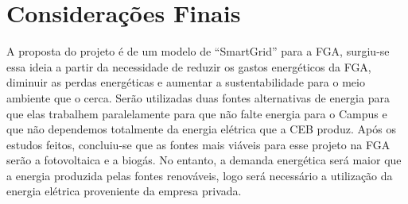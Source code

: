 \chapter[Considerações Finais]{Considerações Finais}

A proposta do projeto é de um modelo de “SmartGrid” para a FGA, surgiu-se essa ideia a partir da necessidade de reduzir os gastos energéticos da FGA, diminuir as perdas energéticas e aumentar a sustentabilidade para o meio ambiente que o cerca. Serão utilizadas duas fontes alternativas de energia para que elas trabalhem paralelamente para que não falte energia para o Campus e que não dependemos totalmente da energia elétrica que a CEB produz. Após os estudos feitos, concluiu-se que as fontes mais viáveis para esse projeto na FGA serão a fotovoltaica e a biogás. No entanto, a demanda energética será maior que a energia produzida pelas fontes renováveis, logo será necessário a utilização da energia elétrica proveniente da empresa privada.